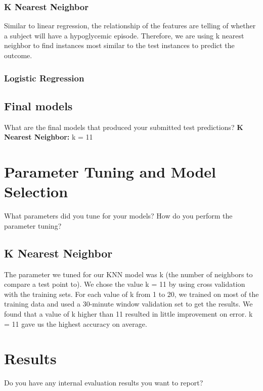 \documentclass[11pt,a4paper]{article}
\begin{document}
\subsubsection{K Nearest Neighbor}
Similar to linear regression, the relationship of the features are telling of whether a subject will have a hypoglycemic episode. Therefore, we are using k nearest neighbor to find instances most similar to the test instances to predict the outcome.
\subsubsection{Logistic Regression}
\subsection{Final models}
What are the final models that produced your submitted test predictions?
\textbf{K Nearest Neighbor: }k = 11

\section{Parameter Tuning and Model Selection }
What parameters did you tune for your models? How do you perform the parameter tuning?
\subsection{K Nearest Neighbor}
The parameter we tuned for our KNN model was k (the number of neighbors to compare a test point to). We chose the value k = 11 by using cross validation with the training sets. For each value of k from 1 to 20, we trained on most of the training data and used a 30-minute window validation set to get the results. We found that a value of k higher than 11 resulted in little improvement on error. k = 11 gave us the highest accuracy on average.

\section{Results}
Do you have any internal evaluation results you want to report?
\end{document}

